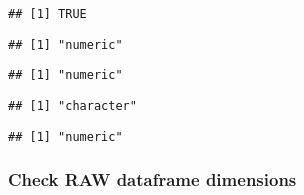 \documentclass[]{article}
\newenvironment{Shaded}{\begin{snugshade}}{\end{snugshade}}
\newcommand{\CommentTok}[1]{\textcolor[rgb]{0.56,0.35,0.01}{\textit{#1}}}
\newcommand{\KeywordTok}[1]{\textcolor[rgb]{0.13,0.29,0.53}{\textbf{#1}}}
\newcommand{\NormalTok}[1]{#1}
\newcommand{\OperatorTok}[1]{\textcolor[rgb]{0.81,0.36,0.00}{\textbf{#1}}}
\begin{document}
\begin{verbatim}
## [1] TRUE
\end{verbatim}

\begin{Shaded}
\end{Shaded}

\begin{verbatim}
## [1] "numeric"
\end{verbatim}

\begin{Shaded}
\end{Shaded}

\begin{verbatim}
## [1] "numeric"
\end{verbatim}

\begin{Shaded}
\end{Shaded}

\begin{verbatim}
## [1] "character"
\end{verbatim}

\begin{Shaded}
\end{Shaded}

\begin{verbatim}
## [1] "numeric"
\end{verbatim}

\hypertarget{check-raw-dataframe-dimensions}{%
\subsubsection{Check RAW dataframe
dimensions}\label{check-raw-dataframe-dimensions}}
\end{document}
